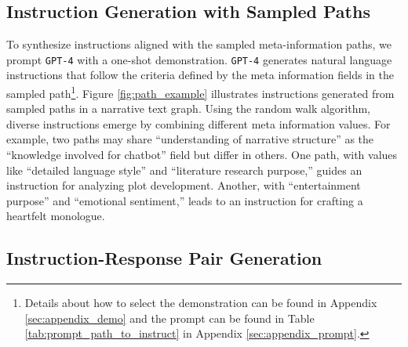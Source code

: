 \subsection{Instruction Generation with Sampled Paths}
\label{sec:path_to_instructs}

To synthesize instructions aligned with the sampled meta-information paths, we prompt {\tt GPT-4} with a one-shot demonstration.
{\tt GPT-4} generates natural language instructions that follow the criteria defined by the meta information fields in the sampled path\footnote{Details about how to select the demonstration can be found in Appendix \ref{sec:appendix_demo} and the prompt can be found in Table \ref{tab:prompt_path_to_instruct} in Appendix \ref{sec:appendix_prompt}.}.  
Figure \ref{fig:path_example} illustrates instructions generated from sampled paths in a narrative text graph. Using the random walk algorithm, diverse instructions emerge by combining different meta information values. For example, two paths may share ``understanding of narrative structure'' as the ``knowledge involved for chatbot'' field but differ in others. One path, with values like ``detailed language style'' and ``literature research purpose,'' guides an instruction for analyzing plot development. Another, with ``entertainment purpose'' and ``emotional sentiment,'' leads to an instruction for crafting a heartfelt monologue.


\subsection{Instruction-Response Pair Generation}

